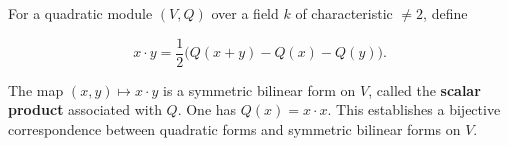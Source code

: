 For a quadratic module $(V,Q)$ over a field $k$ of characteristic $\neq 2$, define

$$x \cdot y = \frac{1}{2}\bigl(Q(x+y) - Q(x) - Q(y)\bigr).$$

The map $(x,y) \mapsto x \cdot y$ is a symmetric bilinear form on $V$, called the \textbf{scalar product} associated with $Q$. One has $Q(x) = x \cdot x$. This establishes a bijective correspondence between quadratic forms and symmetric bilinear forms on $V$.
